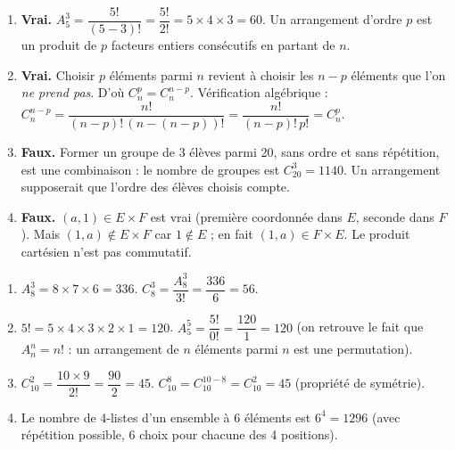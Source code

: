 \documentclass[11pt]{article}
\newcommand{\cle}[1]{{\popxbold\color{popdark}#1}}
\begin{document}
\begin{corrige}
\begin{enumerate}
    \item \textbf{Vrai.} $A_5^3 = \dfrac{5!}{(5-3)!} = \dfrac{5!}{2!} = 5 \times 4 \times 3 = 60$. Un arrangement d'ordre $p$ est un produit de $p$ facteurs entiers consécutifs en partant de $n$.
    \item \textbf{Vrai.} Choisir $p$ éléments parmi $n$ revient à choisir les $n-p$ éléments que l'on \emph{ne prend pas}. D'où $C_n^p = C_n^{n-p}$. Vérification algébrique : $C_n^{n-p} = \dfrac{n!}{(n-p)!\,(n-(n-p))!} = \dfrac{n!}{(n-p)!\,p!} = C_n^p$.
    \item \textbf{Faux.} Former un groupe de 3 élèves parmi 20, sans ordre et sans répétition, est une \cle{combinaison} : le nombre de groupes est $C_{20}^3 = 1140$. Un arrangement supposerait que l'ordre des élèves choisis compte.
    \item \textbf{Faux.} $(a,1) \in E \times F$ est vrai (première coordonnée dans $E$, seconde dans $F$). Mais $(1,a) \notin E \times F$ car $1 \notin E$ ; en fait $(1,a) \in F \times E$. Le produit cartésien n'est pas commutatif.
\end{enumerate}
\end{corrige}

\begin{corrige}
\begin{enumerate}
    \item $A_8^3 = 8 \times 7 \times 6 = 336$.\quad
    $C_8^3 = \dfrac{A_8^3}{3!} = \dfrac{336}{6} = 56$.
    \item $5! = 5 \times 4 \times 3 \times 2 \times 1 = 120$.\quad
    $A_5^5 = \dfrac{5!}{0!} = \dfrac{120}{1} = 120$ (on retrouve le fait que $A_n^n = n!$ : un arrangement de $n$ éléments parmi $n$ est une permutation).
    \item $C_{10}^2 = \dfrac{10 \times 9}{2!} = \dfrac{90}{2} = 45$.\quad
    $C_{10}^8 = C_{10}^{10-8} = C_{10}^2 = 45$ (propriété de symétrie).
    \item Le nombre de 4-listes d'un ensemble à 6 éléments est $6^4 = 1296$ (avec répétition possible, 6 choix pour chacune des 4 positions).
\end{enumerate}
\end{corrige}
\end{document}
